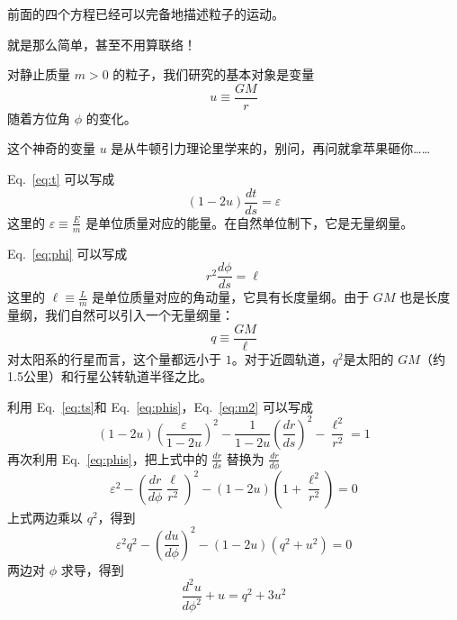 \documentclass[CJK,13pt]{beamer}
\begin{document}
  \begin{frame}
    前面的四个方程已经可以完备地描述粒子的运动。

    
    就是那么简单，甚至不用算联络！
  \end{frame}

  
  \begin{frame}
    对静止质量 $m>0$ 的粒子，我们研究的基本对象是变量
    $$ u \equiv \frac{GM}{r}$$
    随着方位角 $\phi$ 的变化。
   
    {\scriptsize 这个神奇的变量 $u$ 是从牛顿引力理论里学来的，别问，再问就拿苹果砸你……}
    
    \skipline
    
    Eq.~\eqref{eq:t} 可以写成
    \begin{equation}
      \left(1- 2u\right)\frac{dt}{ds} =  \varepsilon \label{eq:ts}
    \end{equation}
    这里的 $\varepsilon \equiv \frac{E}{m}$ 是单位质量对应的能量。在自然单位制下，它是无量纲量。
  \end{frame}

  \begin{frame}
    Eq.~\eqref{eq:phi} 可以写成
    \begin{equation}
      r^2\frac{d\phi}{ds} = \ell \label{eq:phis}
    \end{equation}
    这里的  $\ell \equiv \frac{L}{m}$ 是单位质量对应的角动量，它具有长度量纲。由于 $GM$ 也是长度量纲，我们自然可以引入一个无量纲量：
    \begin{equation}
      q \equiv \frac{GM}{\ell}
    \end{equation}
    对太阳系的行星而言，这个量都远小于 $1$。对于近圆轨道，$q^2$是太阳的 $GM$（约1.5公里）和行星公转轨道半径之比。
  \end{frame}

  \begin{frame}
    利用 Eq.~\eqref{eq:ts}和 Eq.~\eqref{eq:phis}，Eq.~\eqref{eq:m2} 可以写成
    \begin{equation}
      (1-2u) \left(\frac{\varepsilon}{1-2u}\right)^2 - \frac{1}{1-2u}\left(\frac{dr}{ds}\right)^2 - \frac{\ell^2}{r^2} = 1
    \end{equation}
    再次利用 Eq.~\eqref{eq:phis}，把上式中的 $\frac{dr}{ds}$ 替换为 $\frac{dr}{d\phi}$
    \begin{equation}
     \varepsilon^2- \left(\frac{dr}{d\phi}\frac{\ell}{r^2}\right)^2 - (1-2u)\left(1+\frac{\ell^2}{r^2} \right) = 0
    \end{equation}
    上式两边乘以  $q^2$，得到
    \begin{equation}
      \varepsilon^2q^2 - \left(\frac{du}{d\phi}\right)^2 - (1-2u)\left(q^2 + u^2\right) = 0
    \end{equation}
    两边对 $\phi$ 求导，得到
    {\blue
    \begin{equation}
      \frac{d^2u}{d\phi^2} + u =q^2+3u^2
    \end{equation}
    }
  \end{frame}
  
\end{document}
